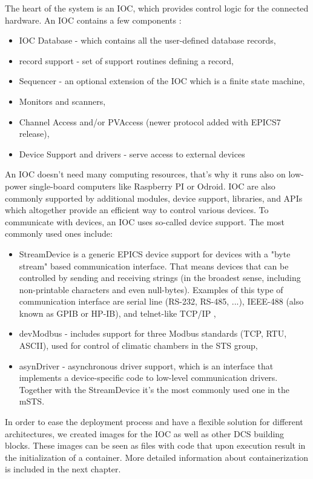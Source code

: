 The heart of the system is an \gls{IOC}, which provides control logic for the connected hardware. An \gls{IOC} contains a few components \cite{IOC}:
\begin{itemize}
    \item \gls{IOC} Database - which contains all the user-defined database  records,
    \item record support - set of support routines defining a record,
    \item Sequencer - an optional extension of the \gls{IOC} which is a finite state machine,
    \item Monitors and scanners,
    \item Channel Access and/or PVAccess (newer protocol added with EPICS7 release),
    \item Device Support and drivers - serve access to external devices
\end{itemize}
An \gls{IOC} doesn't need many computing resources, that's why it runs also on low-power single-board computers like Raspberry PI or Odroid. 
 \gls{IOC} are also commonly supported by additional modules, device support, libraries, and \gls{API}s which altogether provide an efficient way to control various devices.
To communicate with devices, an \gls{IOC} uses so-called device support. The most commonly used ones include:
\begin{itemize}
    \item StreamDevice is a generic EPICS device support for devices with a "byte stream" based communication interface. That means devices that can be controlled by sending and receiving strings (in the broadest sense, including non-printable characters and even null-bytes). Examples of this type of communication interface are serial line (RS-232, RS-485, ...), IEEE-488 (also known as GPIB or HP-IB), and telnet-like TCP/IP \cite{StreamDevice},
    \item devModbus \cite{modbus} - includes support for three Modbus standards (TCP, RTU, ASCII), used for control of climatic chambers in the \gls{STS} group,
    \item asynDriver \cite{asyn} - asynchronous driver support, which is an interface that implements a device-specific code to low-level communication drivers. Together with the StreamDevice it's the most commonly used one in the \gls{mSTS}. 
\end{itemize}

In order to ease the deployment process and have a flexible solution for different architectures, we created images for the \gls{IOC} as well as other \gls{DCS} building blocks. These images can be seen as files with code that upon execution result in the initialization of a container. More detailed information about containerization is included in the next chapter. 
 
